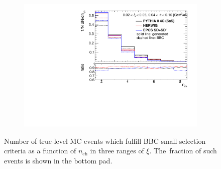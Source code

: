 \begin{figure}[h!]
\begin{subfigure}{.45\textwidth}
		\includegraphics[width=\textwidth,page=3]{chapters/chrgSTAR/img/bbcCorrection/xi_bbc.pdf}
	\end{subfigure}
	\begin{minipage}{.45\textwidth}
		\caption{Number of true-level MC events which fulfill BBC-small selection criteria  as a function of $n_\textrm{ch}$ in three ranges of $\xi$. The~fraction of such events is shown in the bottom pad.}
		\label{fig:bbcCorection_nch}
	\end{minipage}
\end{figure}
